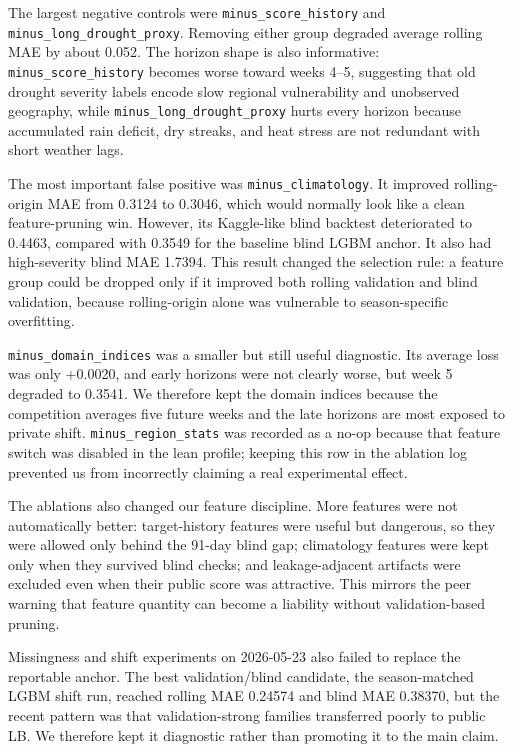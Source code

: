 \documentclass[conference]{IEEEtran}
\begin{document}
The largest negative controls were \texttt{minus\_score\_history} and
\texttt{minus\_long\_drought\_proxy}. Removing either group degraded average rolling
MAE by about 0.052. The horizon shape is also informative:
\texttt{minus\_score\_history} becomes worse toward weeks 4--5, suggesting that
old drought severity labels encode slow regional vulnerability and unobserved
geography, while \texttt{minus\_long\_drought\_proxy} hurts every horizon because
accumulated rain deficit, dry streaks, and heat stress are not redundant with
short weather lags.

The most important false positive was \texttt{minus\_climatology}. It improved
rolling-origin MAE from 0.3124 to 0.3046, which would normally look like a
clean feature-pruning win. However, its Kaggle-like blind backtest deteriorated
to 0.4463, compared with 0.3549 for the baseline blind LGBM anchor. It also had
high-severity blind MAE 1.7394. This result changed the selection rule: a
feature group could be dropped only if it improved both rolling validation and
blind validation, because rolling-origin alone was vulnerable to
season-specific overfitting.

\texttt{minus\_domain\_indices} was a smaller but still useful diagnostic. Its
average loss was only +0.0020, and early horizons were not clearly worse, but
week 5 degraded to 0.3541. We therefore kept the domain indices because the
competition averages five future weeks and the late horizons are most exposed
to private shift. \texttt{minus\_region\_stats} was recorded as a no-op because
that feature switch was disabled in the lean profile; keeping this row in the
ablation log prevented us from incorrectly claiming a real experimental effect.

The ablations also changed our feature discipline. More features were not
automatically better: target-history features were useful but dangerous, so
they were allowed only behind the 91-day blind gap; climatology features were
kept only when they survived blind checks; and leakage-adjacent artifacts were
excluded even when their public score was attractive. This mirrors the peer
warning that feature quantity can become a liability without validation-based
pruning.

Missingness and shift experiments on 2026-05-23 also failed to replace the
reportable anchor. The best validation/blind candidate, the season-matched LGBM
shift run, reached rolling MAE 0.24574 and blind MAE 0.38370, but the recent
pattern was that validation-strong families transferred poorly to public LB. We
therefore kept it diagnostic rather than promoting it to the main claim.
\end{document}
